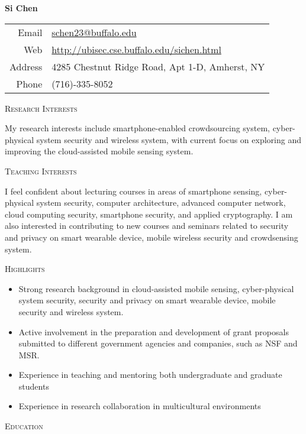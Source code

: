 \documentclass[letter]{article}
\newcommand{\heading}[1]{\item \large \textsc{#1} \normalsize}
\begin{document}
\Huge \textbf{Si Chen} \hfill \small
\begin{tabular}{rl}
Email   & \href{mailto:schen23@buffalo.edu}{schen23@buffalo.edu} \\
Web     & \url{http://ubisec.cse.buffalo.edu/sichen.html} \\
Address & 4285 Chestnut Ridge Road, Apt 1-D, Amherst, NY\\
Phone  & (716)-335-8052\\
\end{tabular}

\normalsize

\begin{description}

\heading{Research Interests}

My research interests include smartphone-enabled crowdsourcing system, cyber-physical system security and wireless system, with current focus on exploring and improving the cloud-assisted mobile sensing system. \\

\heading{Teaching Interests}

I feel confident about lecturing courses in areas of smartphone sensing, cyber-physical system security, computer architecture, advanced computer network, cloud computing security, smartphone security, and applied cryptography. I am also interested in contributing to new courses and seminars related to security and privacy on smart wearable device, mobile wireless security and crowdsensing system.

\heading{Highlights}
\begin{itemize}
\item Strong research background in cloud-assisted mobile sensing, cyber-physical system security, security and privacy on smart wearable device, mobile security and wireless system.

\item Active involvement in the preparation and development of grant proposals submitted to different government agencies and companies, such as NSF and MSR.
\item Experience in teaching and mentoring both undergraduate and graduate students
\item Experience in research collaboration in multicultural environments
\end{itemize}


\heading{Education}


\end{description}
\end{document}
